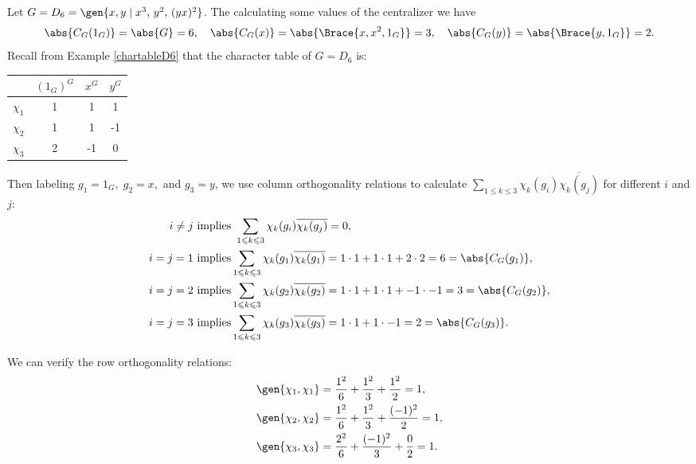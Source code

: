 \documentclass[../Project.tex]{subfiles}
\begin{document}
\begin{exam}[{\cite[Examples 16.5 (1)]{2}}]
	Let $G = D_6  = \gen{x,y\;\vert\;x^3,\, y^2,\,(yx)^2}$. The calculating some values of the centralizer we have
	$$\abs{C_G(1_G)} = \abs{G} = 6,\quad \abs{C_G(x)} = \abs{\Brace{x,x^2,1_G}} = 3,\quad \abs{C_G(y)} = \abs{\Brace{y,1_G}} = 2.$$
	Recall from Example \ref{chartableD6} that the character table of $G = D_6$ is:\\
	\begin{minipage}{\linewidth}
\centering
	\begin{tabular}{c | c  c  c}
		  $ $ & $(1_G)^G$ & $x^G$ & $y^G$\\
	\hline
		$\chi_1$ & 1 & 1 & 1 \\
		$\chi_2$ & 1 & 1 & -1 \\
		$\chi_3$ & 2 & -1 & 0 \\
	\hline
	\end{tabular}
	\end{minipage}

	Then labeling $g_1 = 1_G,\; g_2 = x,$ and $g_3 = y$, we use column orthogonality relations to calculate $\sum\limits_{1 \leqslant k \leqslant 3}\chi_k(g_i)\overline{\chi_k(g_j)}$ for different $i$ and $j$:
	\begin{align*}
		i \neq j &\text{   implies } \sum_{1 \leqslant k \leqslant 3}\chi_k(g_i)\overline{\chi_k(g_j)} = 0,\\
		i = j = 1 &\text{   implies}  \sum_{1 \leqslant k \leqslant 3}\chi_k(g_1)\overline{\chi_k(g_1)} = 1\cdot 1  + 1 \cdot 1 + 2\cdot 2 = 6 = \abs{C_G(g_1)},\\
		i = j = 2 &\text{   implies}  \sum_{1 \leqslant k \leqslant 3}\chi_k(g_2)\overline{\chi_k(g_2)} = 1\cdot 1  + 1 \cdot 1 + -1\cdot -1 = 3 = \abs{C_G(g_2)},\\
		i = j = 3 &\text{   implies}  \sum_{1 \leqslant k \leqslant 3}\chi_k(g_3)\overline{\chi_k(g_3)} = 1\cdot 1  + 1 \cdot -1 = 2 = \abs{C_G(g_3)}.
	\end{align*}

	We can verify the row orthogonality relations:
	\begin{align*}
		\gen{\chi_1,\chi_1} &= \frac{1^2}{6} + \frac{1^2}{3} + \frac{1^2}{2} = 1,\\
		\gen{\chi_2,\chi_2} &= \frac{1^2}{6} + \frac{1^2}{3} + \frac{(-1)^2}{2} = 1,\\
		\gen{\chi_3,\chi_3} &= \frac{2^2}{6} + \frac{(-1)^2}{3} + \frac{0}{2} = 1.
	\end{align*}
\end{exam}
\end{document}
